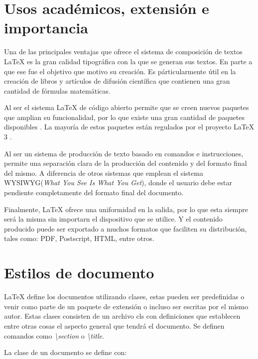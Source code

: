 \documentclass[journal]{IEEEtran}
\begin{document}
\section{Usos académicos, extensión e importancia}
Una de las principales ventajas que ofrece el sistema de composición de textos \LaTeX\xspace  es la gran calidad tipográfica con la que se generan sus textos. En parte a que ese fue el objetivo que motivo su creación.
Es párticularmente útil en la creación de libros y artículos de difusión científica que contienen una gran cantidad de fórmulas matemáticas.

Al ser el sistema \LaTeX\xspace  de código abierto permite que se creen nuevos paquetes que amplian su funcionalidad, por lo que
existe una gran cantidad de paquetes disponibles \cite{ctan}. La mayoría de estos paquetes están regulados por el proyecto \LaTeX\xspace 3 \cite{thelatex3}.

Al ser un sistema de producción de texto basado en comandos e instrucciones, permite una separación clara de la producción del contenido y del formato final del mismo.
A diferencia de otros sistemas que emplean el sistema WYSIWYG(\textit{What You See Is What You Get}), donde el usuario debe estar pendiente completamente del formato final del 
documento.

Finalmente, \LaTeX\xspace  ofrece una uniformidad en la salida, por lo que esta siempre será la misma sin importarn el dispositivo que se utilice.
Y el contenido producido puede ser exportado a muchos formatos que faciliten su distribución, tales como: PDF, Postscript, HTML, entre otros.


\section{Estilos de documento}

\LaTeX\xspace  define los documentos utilizando clases, estas pueden ser predefinidas o venir como parte de un paquete de extensión o incluso ser escritas por el mismo autor.
Estas clases consisten de un archivo cls con definiciones que establecen entre otras cosas el aspecto general que tendrá el documento.
Se definen comandos como \emph{\textbackslash{}section} o \emph{\textbackslash{}title}.

La clase de un documento se define con:
\end{document}
